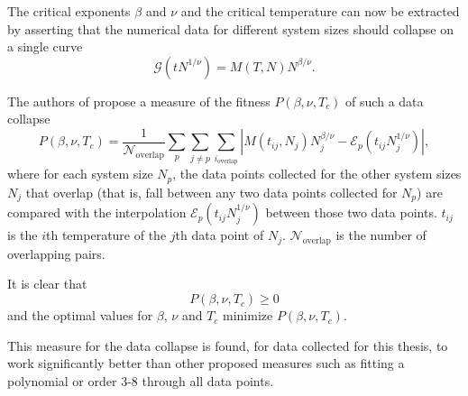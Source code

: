 The critical exponents $\beta$ and $\nu$ and the critical temperature can now be extracted by asserting that the
numerical data for different system sizes should collapse on a single curve
\begin{equation}
  \mathcal{G}(t N^{1/\nu}) = M(T, N) N^{\beta/\nu}.
\end{equation}

The authors of \cite{bhattacharjee2001measure} propose a measure of the fitness $P(\beta, \nu, T_c)$ of such a data collapse
\begin{equation}\label{eq:fitness_data_collapse}
  P(\beta, \nu, T_c) = \frac{1}{\mathcal{N}_{\text{overlap}}} \sum_p \sum_{j \neq p} \sum_{i_{\text{overlap}}}
    |  M(t_{i j}, N_j) N_{j}^{\beta/\nu} - \mathcal{E}_{p}(t_{i j} N_{j}^{1/\nu} ) |,
\end{equation}
where for each system size $N_p$, the data points collected for the other system sizes $N_j$ that overlap (that is,
fall between any two data points collected for $N_p$) are compared with the interpolation $\mathcal{E}_{p}(t_{i j}
N_{j}^{1/\nu})$ between those two data points.
$t_{i j}$ is the $i$th temperature of the $j$th data point of $N_j$.
$\mathcal{N}_{\text{overlap}}$ is the number of overlapping pairs.

It is clear that
\begin{equation}
  P(\beta, \nu, T_c) \geq 0
\end{equation}
and the optimal values for $\beta$, $\nu$ and $T_c$ minimize $P(\beta, \nu, T_c)$.

This measure for the data collapse is found, for data collected for this thesis,
to work significantly better than other proposed measures such as fitting a polynomial or order 3-8 through all data
points.
